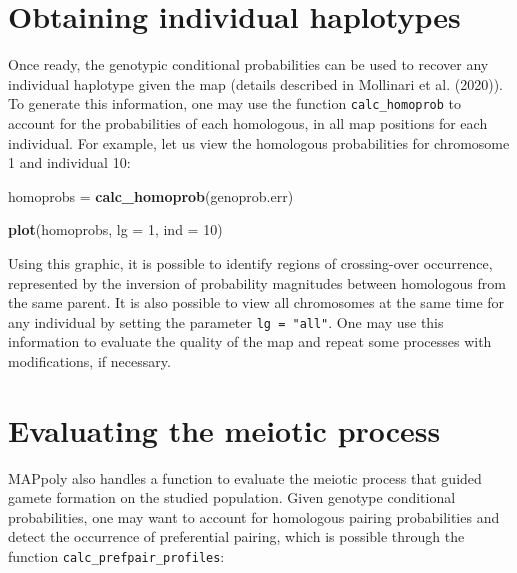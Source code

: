\documentclass[
]{article}
\newenvironment{Shaded}{}{}
\newcommand{\DataTypeTok}[1]{\textcolor[rgb]{0.56,0.13,0.00}{#1}}
\newcommand{\DecValTok}[1]{\textcolor[rgb]{0.25,0.63,0.44}{#1}}
\newcommand{\KeywordTok}[1]{\textcolor[rgb]{0.00,0.44,0.13}{\textbf{#1}}}
\newcommand{\NormalTok}[1]{#1}
\newcommand{\StringTok}[1]{\textcolor[rgb]{0.25,0.44,0.63}{#1}}
\begin{document}
\hypertarget{obtaining-individual-haplotypes}{%
\section{Obtaining individual
haplotypes}\label{obtaining-individual-haplotypes}}

Once ready, the genotypic conditional probabilities can be used to
recover any individual haplotype given the map (details described in
Mollinari et al. (2020)). To generate this information, one may use the
function \texttt{calc\_homoprob} to account for the probabilities of
each homologous, in all map positions for each individual. For example,
let us view the homologous probabilities for chromosome 1 and individual
10:

\begin{Shaded}
\begin{Highlighting}[]
\NormalTok{homoprobs =}\StringTok{ }\KeywordTok{calc_homoprob}\NormalTok{(genoprob.err)}
\end{Highlighting}
\end{Shaded}

\begin{Shaded}
\begin{Highlighting}[]
\KeywordTok{plot}\NormalTok{(homoprobs, }\DataTypeTok{lg =} \DecValTok{1}\NormalTok{, }\DataTypeTok{ind =} \DecValTok{10}\NormalTok{)}
\end{Highlighting}
\end{Shaded}

Using this graphic, it is possible to identify regions of crossing-over
occurrence, represented by the inversion of probability magnitudes
between homologous from the same parent. It is also possible to view all
chromosomes at the same time for any individual by setting the parameter
\texttt{lg\ =\ "all"}. One may use this information to evaluate the
quality of the map and repeat some processes with modifications, if
necessary.

\hypertarget{evaluating-the-meiotic-process}{%
\section{Evaluating the meiotic
process}\label{evaluating-the-meiotic-process}}

MAPpoly also handles a function to evaluate the meiotic process that
guided gamete formation on the studied population. Given genotype
conditional probabilities, one may want to account for homologous
pairing probabilities and detect the occurrence of preferential pairing,
which is possible through the function
\texttt{calc\_prefpair\_profiles}:
\end{document}
